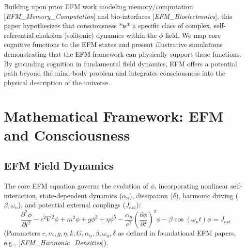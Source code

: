 \documentclass[11pt]{article}
\newcommand{\citep}[1]{[\textit{#1}]} %
\begin{document}
Building upon prior EFM work modeling memory/computation \citep{EFM_Memory_Computation} and bio-interfaces \citep{EFM_Bioelectronics}, this paper hypothesizes that consciousness *is* a specific class of complex, self-referential ehokolon (solitonic) dynamics within the \(\phi\) field. We map core cognitive functions to the EFM states and present illustrative simulations demonstrating that the EFM framework can physically support these functions. By grounding cognition in fundamental field dynamics, EFM offers a potential path beyond the mind-body problem and integrates consciousness into the physical description of the universe.

\section{Mathematical Framework: EFM and Consciousness}

\subsection{EFM Field Dynamics}
The core EFM equation governs the evolution of \(\phi\), incorporating nonlinear self-interaction, state-dependent dynamics (\(\alpha_n\)), dissipation (\(\delta\)), harmonic driving (\(\beta, \omega_n\)), and potential external couplings (\(J_{ext}\)):
\begin{equation}
\frac{\partial^2 \phi}{\partial t^2} - c^2 \nabla^2 \phi + m^2 \phi + g \phi^3 + \eta \phi^5 - \frac{\alpha_n}{c^2} \left(\frac{\partial \phi}{\partial t}\right)^2 \phi - \beta \cos\left(\omega_n t\right) \phi = J_{ext}
\label{eq:efm_consciousness_kge}
\end{equation}
(Parameters \(c, m, g, \eta, k, G, \alpha_n, \beta, \omega_n, \delta\) as defined in foundational EFM papers, e.g., \citep{EFM_Harmonic_Densities}).
\end{document}
